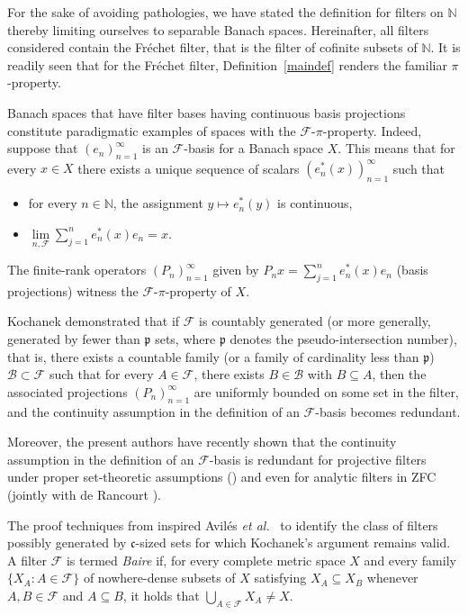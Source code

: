 \documentclass[12pt,fleqn]{amsart}
\newcommand{\FF}{\mathscr{F}}
\theoremstyle{definition}
\theoremstyle{remark}
\begin{document}
For the sake of avoiding pathologies, we have stated the definition for filters on $\mathbb N$ thereby limiting ourselves to separable Banach spaces. Hereinafter, all filters considered contain the Fréchet filter, that is the filter of cofinite subsets of $\mathbb N$. It is readily seen that for the Fréchet filter, Definition~\ref{maindef} renders the familiar $\pi$-property. 

Banach spaces that have filter bases having continuous basis projections constitute paradigmatic examples of spaces with the $\FF$-$\pi$-property. Indeed, suppose that $(e_n)_{n=1}^\infty$ is an $\FF$-basis for a Banach space $X$. This means that for every $x\in X$ there exists a unique sequence of scalars $(e_n^*(x))_{n=1}^\infty$ such that
\begin{itemize}
    \item for every $n\in \mathbb N$, the assignment $y\mapsto e_n^*(y)$ is continuous,
    \item $\lim\limits_{n, \FF}\sum_{j=1}^n e_n^*(x)e_n =x$.
\end{itemize}
The finite-rank operators $(P_n)_{n=1}^\infty$ given by $P_n x = \sum_{j=1}^n e_n^*(x) e_n$ (basis projections) witness the $\FF$-$\pi$-property of $X$. \smallskip

Kochanek \cite{Kochanek} demonstrated that if \(\mathcal{F}\) is countably generated (or more generally, generated by fewer than \(\mathfrak{p}\) sets, where \(\mathfrak{p}\) denotes the pseudo-intersection number), that is, there exists a countable family (or a family of cardinality less than \(\mathfrak{p}\)) \(\mathscr{B} \subset \mathcal{F}\) such that for every \( A \in \mathcal{F} \), there exists \( B \in \mathscr{B} \) with \( B \subseteq A \), then the associated projections \((P_n)_{n=1}^\infty\) are uniformly bounded on some set in the filter, and the continuity assumption in the definition of an \(\mathcal{F}\)-basis becomes redundant. 

Moreover, the present authors have recently shown that the continuity assumption in the definition of an \(\mathcal{F}\)-basis is redundant for projective filters under proper set-theoretic assumptions (\cite{KaniaSwaczyna}) and even for analytic filters in ZFC (jointly with de Rancourt \cite{RKS}). 

The proof techniques from \cite{Kochanek} inspired Avil\'es \emph{et al.}~\cite{avilesetal} to identify the class of filters possibly generated by \(\mathfrak{c}\)-sized sets for which Kochanek's argument remains valid. A filter \(\mathcal{F}\) is termed \emph{Baire} if, for every complete metric space \( X \) and every family \(\{X_A \colon A \in \mathcal{F}\}\) of nowhere-dense subsets of \( X \) satisfying \( X_A \subseteq X_B \) whenever \( A, B \in \mathcal{F} \) and \( A \subseteq B \), it holds that \(\bigcup_{A \in \mathcal{F}} X_A \neq X\). 
\end{document}
